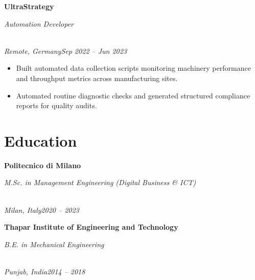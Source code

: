 \documentclass[a4paper,10pt]{article}
\newcommand{\role}[4]{\vspace{3pt}\noindent\hspace{0.6em}\parbox[t]{0.38\textwidth}{\raggedright\textbf{#1}}\hfill\parbox[t]{0.58\textwidth}{\raggedleft\textit{#2}}\\{\textit{#3}\hfill\textit{#4}}\vspace{1pt}}
\begin{document}
\role{UltraStrategy}{Automation Developer}{Remote, Germany}{Sep 2022 -- Jun 2023}
\begin{itemize}
\item Built automated data collection scripts monitoring machinery performance and throughput metrics across manufacturing sites.
\item Automated routine diagnostic checks and generated structured compliance reports for quality audits.
\end{itemize}

\section{Education}
\role{Politecnico di Milano}{M.Sc. in Management Engineering (Digital Business \& ICT)}{Milan, Italy}{2020 -- 2023}
\role{Thapar Institute of Engineering and Technology}{B.E. in Mechanical Engineering}{Punjab, India}{2014 -- 2018}
\end{document}
